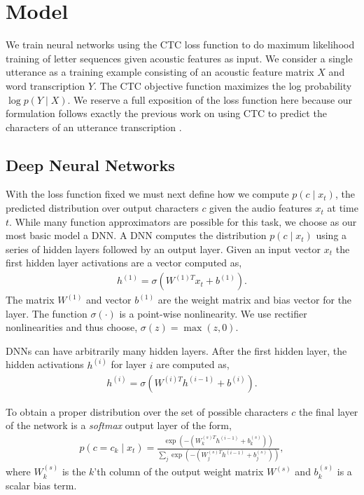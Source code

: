 \section{Model}
\label{sec:first_pass:model}

We train neural networks using the CTC loss function to do maximum
likelihood training of letter sequences given acoustic features as
input. We consider a single utterance as a training example consisting
of an acoustic feature matrix $X$ and word transcription $Y$. The CTC
objective function maximizes the log probability $\log p(Y \mid X)$. We
reserve a full exposition of the loss function here because our
formulation follows exactly the previous work on using CTC to predict
the characters of an utterance transcription \cite{graves2014, graves2006}. 

\subsection{Deep Neural Networks}
\label{sec:first_pass:model:dnn}

With the loss function fixed we must next define how we compute $p(c \mid
x_t)$, the predicted distribution over output characters $c$ given the audio
features $x_t$ at time $t$. While many function approximators are possible for
this task, we choose as our most basic model a DNN. A DNN computes the
distribution $p(c \mid x_t)$ using a series of hidden layers followed by an output
layer. Given an input vector $x_t$ the first hidden layer activations are a
vector computed as,
\begin{align*}
  h^{(1)} = \sigma(W^{(1)T} x_t + b^{(1)}).
\end{align*}
The matrix $W^{(1)}$ and vector $b^{(1)}$ are the weight matrix and bias vector
for the layer. The function $\sigma(\cdot)$ is a point-wise nonlinearity. We
use rectifier nonlinearities and thus choose, $\sigma(z) = \max (z, 0)$.

DNNs can have arbitrarily many hidden layers. After the first hidden
layer, the hidden activations $h^{(i)}$ for layer $i$ are computed as,
\begin{align*}
  h^{(i)} = \sigma(W^{(i)T} h^{(i-1)} + b^{(i)}).
\end{align*}

To obtain a proper distribution over the set of possible characters $c$ the
final layer of the network is a \emph{softmax} output layer of the form,
\begin{align*}
  p(c=c_k \mid x_t) = \frac{\exp(- ( W^{(s)T}_k h^{(i-1)} + b^{(s)}_k))}
  {\sum_j \exp(- ( W^{(s)T}_j h^{(i-1)} + b^{(s)}_j))},
\end{align*}
where $W^{(s)}_k$ is the $k$'th column of the output weight matrix $W^{(s)}$
and $b^{(s)}_k$ is a scalar bias term. 

